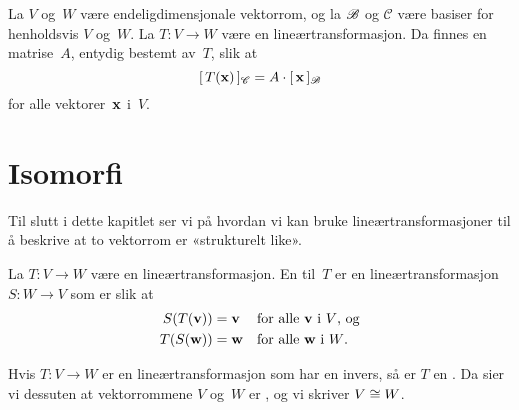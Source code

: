 

\begin{thm}
La $V$ og~$W$ være endeligdimensjonale vektorrom, og la $\mathscr{B}$ og
$\mathscr{C}$ være basiser for henholdsvis $V$ og~$W$.  La
$T \colon V \to W$ være en lineærtransformasjon.  Da finnes en
matrise~$A$, entydig bestemt av~$T$, slik at
\[
[\,{T(\mathbf{x})}\,]_{\mathscr{C}} = A \cdot [\,{\mathbf{x}}\,]_{\mathscr{B}}
\]
for alle vektorer~$\mathbf{x}$ i~$V$.
\end{thm}



\section*{Isomorfi}

Til slutt i dette kapitlet ser vi på hvordan vi kan bruke
lineærtransformasjoner til å beskrive at to vektorrom er «strukturelt like». %

\begin{defn}
La $T \colon V \to W$ være en lineærtransformasjon.  En
 til~$T$ er en lineærtransformasjon $S \colon W \to V$
som er slik at
\begin{align*}
S(T(\mathbf{v})) &= \mathbf{v} &&\text{for alle $\mathbf{v}$ i~$V$, og} \\
T(S(\mathbf{w})) &= \mathbf{w} &&\text{for alle $\mathbf{w}$ i~$W$.}
\end{align*}
\end{defn}

\begin{defn}
Hvis $T \colon V \to W$ er en lineærtransformasjon som har en invers,
så er $T$ en .  Da sier vi dessuten at vektorrommene
$V$ og~$W$ er , og vi skriver $V \cong W$.
\end{defn}



\kapittelslutt
